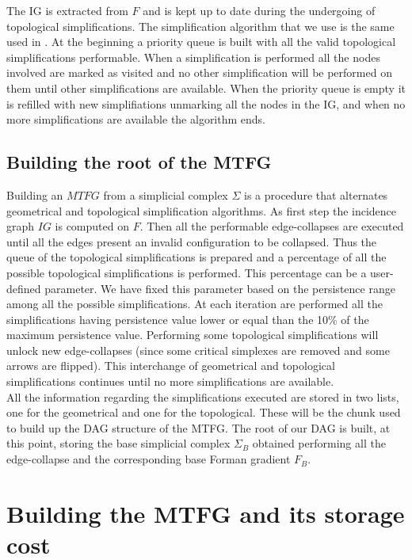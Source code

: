 \documentclass[preprint,5p,times,onecolumn]{article}
\begin{document}
The IG is extracted from $F$ and is kept up to date during the undergoing of topological simplifications. The simplification algorithm that we use is the same used in \cite{Comi11a}. At the beginning a priority queue is built with all the valid topological simplifications performable. When a simplification is performed all the nodes involved are marked as visited and no other simplification will be performed on them until other simplifications are available. When the priority queue is empty it is refilled with new simplifiations unmarking all the nodes in the IG, and when no more simplifications are available the algorithm ends.


\subsection{Building the root of the MTFG}
Building an $MTFG$ from a simplicial complex $\Sigma$ is a procedure that alternates geometrical and topological simplification algorithms. As first step the incidence graph $IG$ is computed on $F$.
Then all the performable edge-collapses are executed until all the edges present an invalid configuration to be collapsed. Thus the queue of the topological simplifications is prepared and a percentage of all the possible topological simplifications is performed. This percentage can be a user-defined parameter. We have fixed this parameter based on the persistence range among all the possible simplifications. At each iteration are performed all the simplifications having persistence value lower or equal than the 10\% of the maximum persistence value. Performing some topological simplifications will unlock new edge-collapses (since some critical simplexes are removed and some arrows are flipped). This interchange of geometrical and topological simplifications continues until no more simplifications are available.\\

All the information regarding the simplifications executed are stored in two lists, one for the geometrical and one for the topological. These will be the chunk used to build up the DAG structure of the MTFG. The root of our DAG is built, at this point, storing the base simplicial complex $\Sigma_B$ obtained performing all the edge-collapse and the corresponding base Forman gradient $F_B$.


\section{Building the MTFG and its storage cost}
\label{sec:store}
\end{document}
